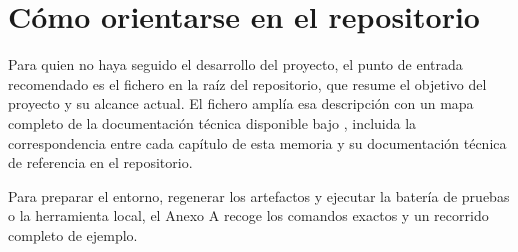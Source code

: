 \section*{Cómo orientarse en el repositorio}

Para quien no haya seguido el desarrollo del proyecto, el punto de entrada
recomendado es el fichero  en la raíz del repositorio, que
resume el objetivo del proyecto y su alcance actual. El fichero
 amplía esa descripción con un mapa completo de la
documentación técnica disponible bajo , incluida la
correspondencia entre cada capítulo de esta memoria y su documentación
técnica de referencia en el repositorio.

Para preparar el entorno, regenerar los artefactos y ejecutar la batería de
pruebas o la herramienta local, el Anexo A recoge los comandos exactos y un
recorrido completo de ejemplo.
